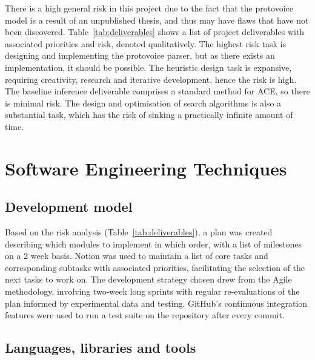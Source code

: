 \documentclass[12pt,a4paper,twoside,openright]{report} \usepackage[pdfborder={0 0 0}]{hyperref}    %
\theoremstyle{definition} \newtheorem{definition}{Definition}[section]
\begin{document}
There is a high general risk in this project due to the fact that the protovoice model is a result of an unpublished
thesis, and thus may have flaws that have not been discovered. Table~\ref{tab:deliverables} shows a list of project
deliverables with associated priorities and risk, denoted qualitatively. The highest risk task is designing and
implementing the protovoice parser, but as there exists an implementation, it should be possible. The heuristic design
task is expansive, requiring creativity, research and iterative development, hence the risk is high. The baseline
inference deliverable comprises a standard method for ACE, so there is minimal risk. The design and optimisation of
search algorithms is also a substantial task, which has the risk of sinking a practically infinite amount of time.


\section{Software Engineering Techniques}

\subsection{Development model}

Based on the risk analysis (Table~\ref{tab:deliverables}), a plan was created describing which modules to implement in
which order, with a list of milestones on a 2 week basis. Notion was used to maintain a list of core tasks and
corresponding subtasks with associated priorities, facilitating the selection of the next tasks to work on. The
development strategy chosen drew from the Agile methodology, involving two-week long sprints with regular re-evaluations
of the plan informed by experimental data and testing. GitHub's continuous integration features were used to run a test
suite on the repository after every commit.  

\subsection{Languages, libraries and tools}
\end{document}
